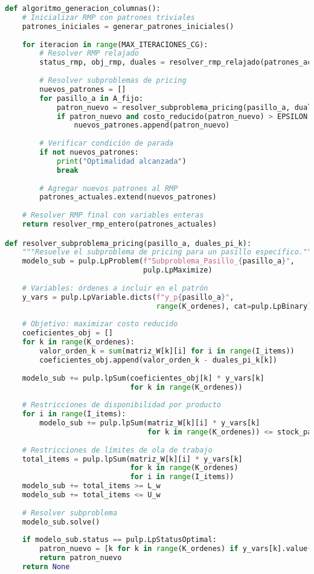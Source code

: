 \documentclass[a4paper,12pt]{article}
\begin{document}
\begin{lstlisting}[language=Python, caption=Algoritmo principal de generación de columnas]
def algoritmo_generacion_columnas():
    # Inicializar RMP con patrones triviales
    patrones_iniciales = generar_patrones_iniciales()
    
    for iteracion in range(MAX_ITERACIONES_CG):
        # Resolver RMP relajado
        status_rmp, obj_rmp, duales = resolver_rmp_relajado(patrones_actuales)
        
        # Resolver subproblemas de pricing
        nuevos_patrones = []
        for pasillo_a in A_fijo:
            patron_nuevo = resolver_subproblema_pricing(pasillo_a, duales)
            if patron_nuevo and costo_reducido(patron_nuevo) > EPSILON:
                nuevos_patrones.append(patron_nuevo)
        
        # Verificar condición de parada
        if not nuevos_patrones:
            print("Optimalidad alcanzada")
            break
            
        # Agregar nuevos patrones al RMP
        patrones_actuales.extend(nuevos_patrones)
    
    # Resolver RMP final con variables enteras
    return resolver_rmp_entero(patrones_actuales)

def resolver_subproblema_pricing(pasillo_a, duales_pi_k):
    """Resuelve el subproblema de pricing para un pasillo específico."""
    modelo_sub = pulp.LpProblem(f"Subproblema_Pasillo_{pasillo_a}", 
                                pulp.LpMaximize)
    
    # Variables: órdenes a incluir en el patrón
    y_vars = pulp.LpVariable.dicts(f"y_p{pasillo_a}", 
                                   range(K_ordenes), cat=pulp.LpBinary)
    
    # Objetivo: maximizar costo reducido
    coeficientes_obj = []
    for k in range(K_ordenes):
        valor_orden_k = sum(matriz_W[k][i] for i in range(I_items))
        coeficientes_obj.append(valor_orden_k - duales_pi_k[k])
    
    modelo_sub += pulp.lpSum(coeficientes_obj[k] * y_vars[k] 
                             for k in range(K_ordenes))
    
    # Restricciones de disponibilidad por producto
    for i in range(I_items):
        modelo_sub += pulp.lpSum(matriz_W[k][i] * y_vars[k] 
                                 for k in range(K_ordenes)) <= stock_pasillo_a[i]
    
    # Restricciones de límites de ola de trabajo
    total_items = pulp.lpSum(matriz_W[k][i] * y_vars[k] 
                             for k in range(K_ordenes) 
                             for i in range(I_items))
    modelo_sub += total_items >= L_w
    modelo_sub += total_items <= U_w
    
    # Resolver subproblema
    modelo_sub.solve()
    
    if modelo_sub.status == pulp.LpStatusOptimal:
        patron_nuevo = [k for k in range(K_ordenes) if y_vars[k].value() > 0.5]
        return patron_nuevo
    return None
\end{lstlisting}
\end{document}
